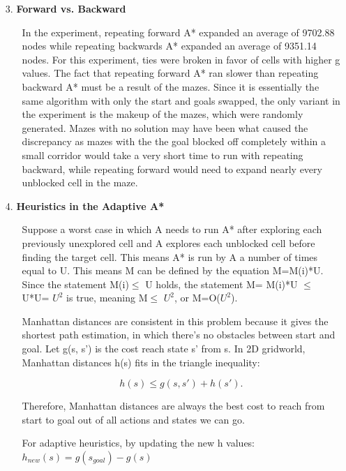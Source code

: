 \documentclass{article}
\begin{document}
\begin{enumerate}
\begin{enumerate}
            \end{enumerate}
        \item[3.] \textbf{Forward vs. Backward}
            \begin{enumerate}
                \item[] In the experiment, repeating forward A* expanded an average of 9702.88 nodes while repeating backwards A* expanded an average of 9351.14 nodes.  For this experiment, ties were broken in favor of cells with higher g values.  The fact that repeating forward A* ran slower than repeating backward A* must be a result of the mazes.  Since it is essentially the same algorithm with only the start and goals swapped, the only variant in the experiment is the makeup of the mazes, which were randomly generated.  Mazes with no solution may have been what caused the discrepancy as mazes with the the goal blocked off completely within a small corridor would take a very short time to run with repeating backward, while repeating forward would need to expand nearly every unblocked cell in the maze.
            \end{enumerate}
        \item[4.] \textbf{Heuristics in the Adaptive A* }
            \begin{enumerate}
                \item[] Suppose a worst case in which A needs to run A* after exploring each previously unexplored cell and A explores each unblocked cell before finding the target cell. This means A* is run by A a number of times equal to U. This means M can be defined by the equation M=M(i)*U. Since the statement  M(i)$\le$ U holds, the statement M= M(i)*U $\le$ U*U= $U^2$ is true, meaning M$\le$ $U^2$, or M=O($U^2$). 
            
            \item[ ] Manhattan distances are consistent in this problem because it gives the shortest path estimation, in which there's no obstacles between start and goal.
            Let g(s, s') is the cost reach state s' from s. In 2D gridworld, Manhattan distances h(s) fits in the triangle inequality: 
            
            \[h(s) \leq g(s, s') + h(s'). \]
            
            Therefore, Manhattan distances are always the best cost to reach from start to goal out of all actions and states we can go.

            For adaptive heuristics, by updating the new h values: 
            $h_{new}(s) = g(s_{goal}) - g(s)$ \par


\end{enumerate}
\end{enumerate}
\end{document}
